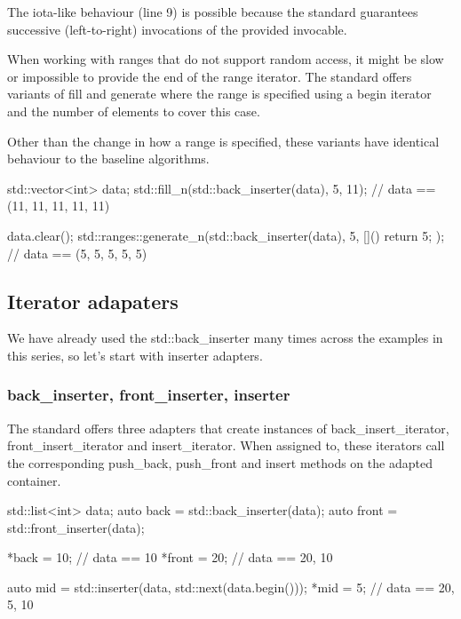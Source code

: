 The iota-like behaviour (line 9) is possible because the standard guarantees successive (left-to-right) invocations of the provided invocable.

When working with ranges that do not support random access, it might be slow or impossible to provide the end of the range iterator. The standard offers variants of fill and generate where the range is specified using a begin iterator and the number of elements to cover this case.



Other than the change in how a range is specified, these variants have identical behaviour to the baseline algorithms.

\begin{box-note}
\begin{cppcode}
std::vector<int> data;
std::fill_n(std::back_inserter(data), 5, 11);
// data == (11, 11, 11, 11, 11)

data.clear();
std::ranges::generate_n(std::back_inserter(data), 5, []() { return 5; });
// data == (5, 5, 5, 5, 5)
\end{cppcode}
\end{box-note}

\subsection{Iterator adapaters}

We have already used the std::back\_inserter many times across the examples in this series, so let's start with inserter adapters.

\subsubsection{back\_inserter, front\_inserter, inserter}

The standard offers three adapters that create instances of back\_insert\_iterator, front\_insert\_iterator and insert\_iterator. When assigned to, these iterators call the corresponding push\_back, push\_front and insert methods on the adapted container.

\begin{box-note}
\begin{cppcode}
std::list<int> data;
auto back = std::back_inserter(data);
auto front = std::front_inserter(data);

*back = 10;
// data == { 10 }
*front = 20;
// data == { 20, 10 }

auto mid = std::inserter(data, std::next(data.begin()));
*mid = 5;
// data == { 20, 5, 10 }
\end{cppcode}
\end{box-note}

